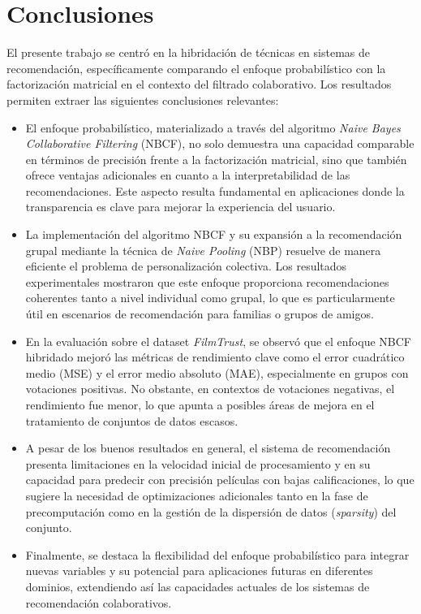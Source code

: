 \documentclass[runningheads,a4paper]{llncs}
\begin{document}
\section{Conclusiones}

El presente trabajo se centró en la hibridación de 
técnicas en sistemas de recomendación, específicamente 
comparando el enfoque probabilístico con la 
factorización matricial en el contexto del filtrado 
colaborativo. Los resultados permiten extraer las 
siguientes conclusiones relevantes:

\begin{itemize}
    \item El enfoque probabilístico, materializado a través del algoritmo \textit{Naive Bayes Collaborative Filtering} (NBCF), no solo demuestra una capacidad comparable en términos de precisión frente a la factorización matricial, sino que también ofrece ventajas adicionales en cuanto a la interpretabilidad de las recomendaciones. Este aspecto resulta fundamental en aplicaciones donde la transparencia es clave para mejorar la experiencia del usuario.
    
    \item La implementación del algoritmo NBCF y su expansión a la recomendación grupal mediante la técnica de \textit{Naive Pooling} (NBP) resuelve de manera eficiente el problema de personalización colectiva. Los resultados experimentales mostraron que este enfoque proporciona recomendaciones coherentes tanto a nivel individual como grupal, lo que es particularmente útil en escenarios de recomendación para familias o grupos de amigos.

    \item En la evaluación sobre el dataset \textit{FilmTrust}, se observó que el enfoque NBCF hibridado mejoró las métricas de rendimiento clave como el error cuadrático medio (MSE) y el error medio absoluto (MAE), especialmente en grupos con votaciones positivas. No obstante, en contextos de votaciones negativas, el rendimiento fue menor, lo que apunta a posibles áreas de mejora en el tratamiento de conjuntos de datos escasos.

    \item A pesar de los buenos resultados en general, el sistema de recomendación presenta limitaciones en la velocidad inicial de procesamiento y en su capacidad para predecir con precisión películas con bajas calificaciones, lo que sugiere la necesidad de optimizaciones adicionales tanto en la fase de precomputación como en la gestión de la dispersión de datos (\textit{sparsity}) del conjunto.

    \item Finalmente, se destaca la flexibilidad del enfoque probabilístico para integrar nuevas variables y su potencial para aplicaciones futuras en diferentes dominios, extendiendo así las capacidades actuales de los sistemas de recomendación colaborativos.

\end{itemize}
\end{document}

